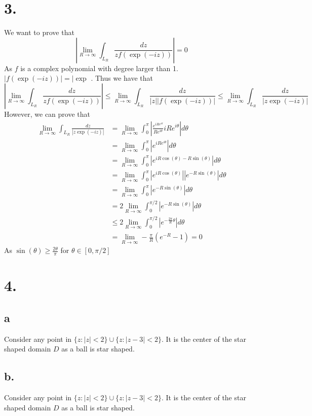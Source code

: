 \documentclass[11pt]{article}
\begin{document}
\section*{3.}
We want to prove that 
\[
    \left| \lim_{R \to \infty} \int_{L_R} \frac{dz}{z f(\exp(-iz))} \right| = 0    
\]
As $f$ is a complex polynomial with degree larger than 1. $|f(\exp(-iz))| = |\exp$ . Thus we have that 
\[
    \left| \lim_{R \to \infty} \int_{L_R} \frac{dz}{z f(\exp(-iz))} \right| \le \lim_{R \to \infty} \int_{L_R} \frac{dz}{ |z| |f(\exp(-iz))|} \le \lim_{R \to \infty} \int_{L_R} \frac{dz}{|z \exp(-iz)|}
\]
However, we can prove that 
\begin{equation*}
    \begin{aligned}
        \lim_{R \to \infty} \int_{L_R} \frac{dz}{|z \exp(-iz)|}  &= \lim_{R \to \infty} \int_0^\pi \left| \frac{e^{iRe^{i\theta}}}{Re^{i\theta}} iRe^{i\theta} \right| d\theta \\
        &= \lim_{R \to \infty} \int_0^\pi |e^{iRe^{i\theta}} | d\theta \\
        &= \lim_{R \to \infty} \int_0^\pi |e^{iR\cos(\theta) - R\sin(\theta)} | d\theta \\
        &= \lim_{R \to \infty} \int_0^\pi |e^{iR\cos(\theta)}| |e^{-R\sin(\theta)} | d\theta \\
        &= \lim_{R \to \infty} \int_0^\pi |e^{-R \sin(\theta)} |  d\theta \\
        &= 2\lim_{R \to \infty} \int_0^{\pi/2} |e^{-R\sin(\theta)}| d\theta \\
        &\le 2\lim_{R \to \infty} \int_0^{\pi/2} |e^{-\frac{2\pi}{R}\theta}| d\theta \\
        &= \lim_{R \to \infty} - \frac{\pi}{R} (e^{-R} - 1) = 0
    \end{aligned}
\end{equation*}
As $\sin(\theta) \ge \frac{2\theta}{\pi}$ for $\theta \in [0,\pi/2]$
\newpage
\section*{4.}
\subsection*{a}
Consider any point in $\{z: |z|<2\} \cup \{z: |z-3| <2\}$. It is the center of the star shaped domain $D$ as a ball is star shaped.
\subsection*{b.}
Consider any point in $\{z: |z|<2\} \cup \{z: |z-3| <2\}$. It is the center of the star shaped domain $D$ as a ball is star shaped.
\end{document}
